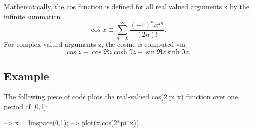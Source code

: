 Mathematically, the {\ttfamily cos} function is defined for all real valued arguments {\ttfamily x} by the infinite summation \[ \cos x \equiv \sum_{n=0}^{\infty} \frac{(-1)^n x^{2n}}{(2n)!}. \] For complex valued arguments {\ttfamily z}, the cosine is computed via \[ \cos z \equiv \cos \Re z \cosh \Im z - \sin \Re z \sinh \Im z. \] \hypertarget{variables_struct_Example}{}\subsection{Example}\label{variables_struct_Example}
The following piece of code plots the real-\/valued {\ttfamily cos(2 pi x)} function over one period of {\ttfamily \mbox{[}0,1\mbox{]}}\-:


\begin{DoxyVerbInclude}
--> x = linspace(0,1);
--> plot(x,cos(2*pi*x))
\end{DoxyVerbInclude}


